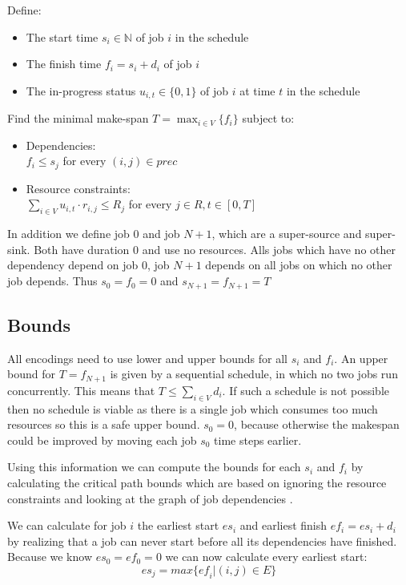 \documentclass{sig-alternate}
\newcommand{\mli}[1]{\mathit{#1}}
\begin{document}
Define:
\begin{itemize}
\item The start time $s_i \in \mathbb{N}$ of job $i$ in the schedule
\item The finish time $f_i = s_i + d_i$ of job $i$
\item The in-progress status $u_{i,t} \in \{0,1\}$ of job $i$ at time $t$ in the schedule
\end{itemize}

\newpage

Find the minimal make-span $T = \max_{i \in V}\{f_i\}$ subject to:
\begin{itemize}
\item Dependencies: \\ $f_i \leq s_j$ for every $(i,j) \in prec$
\item Resource constraints: \\ $\sum_{i \in V}{u_{i,t} \cdot r_{i,j}} \leq R_j$ for every $j \in R, t \in [0,T]$
\end{itemize}

In addition we define job $0$ and job $N+1$, which are a super-source and super-sink.
Both have duration $0$ and use no resources.
Alls jobs which have no other dependency depend on job $0$, job $N+1$ depends on all jobs on which no other job depends.
Thus $s_0 = f_0 = 0$ and $s_{N+1} = f_{N+1} = T$

\subsection{Bounds}

All encodings need to use lower and upper bounds for all $s_i$ and $f_i$.
An upper bound for $T = f_{N+1}$ is given by a sequential schedule, in which no two jobs run concurrently.
This means that $T \leq \sum_{i \in V}{d_i}$.
If such a schedule is not possible then no schedule is viable as there is a single job which consumes too much resources so this is a safe upper bound.
$s_0 = 0$, because otherwise the makespan could be improved by moving each job $s_0$ time steps earlier.

Using this information we can compute the bounds for each $s_i$ and $f_i$ by calculating the critical path bounds  which are based on ignoring the resource constraints and looking at the graph of job dependencies \cite{klein1999computing}.

We can calculate for job $i$ the earliest start $es_i$ and earliest finish $ef_i = es_i + d_i$ by realizing that a job can never start before all its dependencies have finished.
Because we know $es_0 = ef_0 = 0$ we can now calculate every earliest start:
$$\mli{es}_j = max\{\mli{ef}_i | (i,j) \in E\}$$
\end{document}
